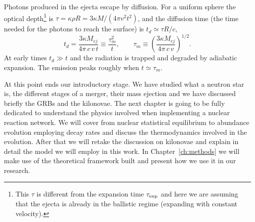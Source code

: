 Photons produced in the ejecta escape by diffusion.
For a uniform sphere the optical depth\footnote{This $\tau$ is different from the expansion time $\tau_{\rm exp}$ and here we are assuming that the ejecta is already in the ballistic regime (expanding with constant velocity).} is $\tau=\kappa\rho R=3\kappa M/(4\pi v^{2}t^{2})$, and the diffusion time (the time needed for the photons to reach the surface) is $t_d\simeq\tau R/c$,
\begin{equation}\label{eq:td}
  t_d=\frac{3\kappa M_{ej}}{4\pi\,c\,v\,t}\equiv\frac{\tau_m^{2}}{t},\qquad
  \tau_m\equiv\left(\frac{3\kappa M_{ej}}{4\pi\,c\,v}\right)^{1/2}.
\end{equation}
At early times $t_d\gg t$ and the radiation is trapped and degraded by adiabatic expansion.
The emission peaks roughly when $t \simeq \tau_m$.

At this point ends our introductory stage.
We have studied what a neutron star is, the different stages of a merger, their mass ejection and we have discussed briefly the GRBs and the kilonovae.
The next chapter is going to be fully dedicated to understand the physics involved when implementing a nuclear reaction network.
We will cover from nuclear statistical equilibrium to abundance evolution employing decay rates and discuss the thermodynamics involved in the evolution.
After that we will retake the discussion on kilonovae and explain in detail the model we will employ in this work.
In Chapter~\ref{ch:methods} we will make use of the theoretical framework built and present how we use it in our research.



